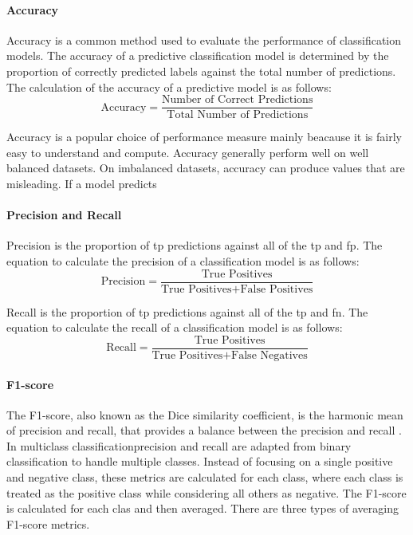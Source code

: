 \documentclass[10pt, conference]{IEEEtran}
\begin{document}
\paragraph{Accuracy}
Accuracy is a common method used to evaluate the performance of classification models. The accuracy of
a predictive classification model is determined by the proportion of correctly predicted labels against
the total number of predictions. The calculation of the accuracy of a predictive model is as follows:
\begin{equation}
    \text{Accuracy} = \frac{\text{Number of Correct Predictions}}{\text{Total Number of Predictions}} \label{accuracy}
\end{equation}

Accuracy is a popular choice of performance measure mainly beacause it is fairly easy to understand and compute.
Accuracy generally perform well on well balanced datasets. On imbalanced datasets, accuracy can produce
values that are misleading. If a model predicts 

\paragraph{Precision and Recall}
Precision is the proportion of \acrfull{tp} predictions against all of the \acrshort{tp} and \acrfull{fp}.
The equation to calculate the precision of a classification model is as follows:
\begin{equation}
    \text{Precision} = \frac{\text{True Positives}}{\text{True Positives} + \text{False Positives}} \label{Precision}
\end{equation}

Recall is the proportion of \acrshort{tp} predictions against all of the \acrshort{tp} and \acrfull{fn}.
The equation to calculate the recall of a classification model is as follows:
\begin{equation}
    \text{Recall} = \frac{\text{True Positives}}{\text{True Positives} + \text{False Negatives}} \label{Recall}
\end{equation}

\paragraph{F1-score}

The F1-score, also known as the Dice similarity coefficient, is the harmonic mean of precision and recall,
that provides a balance between the precision and recall \cite{F1-score_ref}.
In multiclass classificationprecision and recall are adapted from binary classification to handle multiple classes.
Instead of focusing on a single positive and negative class, these metrics are calculated for each class,
where each class is treated as the positive class while considering all others as negative. The F1-score
is calculated for each clas and then averaged. There are three types of averaging F1-score metrics.
\end{document}
